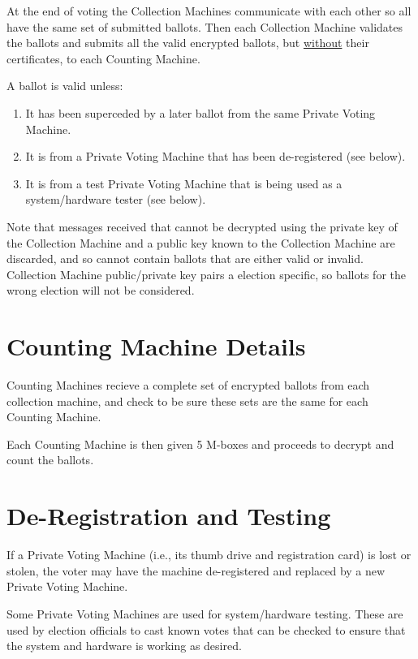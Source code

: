 \documentclass[12pt]{article}
\begin{document}
At the end of voting the Collection Machines communicate with each
other so all have the same set of submitted ballots.  Then each
Collection Machine validates the ballots and submits all the
valid encrypted ballots, but \underline{without} their certificates, to
each Counting Machine.

A ballot is valid unless:

\begin{enumerate}
\item It has been superceded by a later ballot from the same
Private Voting Machine.
\item It is from a Private Voting Machine that has been de-registered
(see below).
\item It is from a test Private Voting Machine that is
being used as a system/hardware tester (see below).
\end{enumerate}

Note that messages received that cannot be decrypted using the
private key of the Collection Machine and a public key known
to the Collection Machine are discarded, and so cannot contain
ballots that are either valid or invalid.  Collection Machine
public/private key pairs a election specific, so ballots for
the wrong election will not be considered.

\section{Counting Machine Details}

Counting Machines recieve a complete set of encrypted ballots
from each collection machine, and check to be sure these sets
are the same for each Counting Machine.

Each Counting Machine is then given 5 M-boxes and proceeds to
decrypt and count the ballots.

\section{De-Registration and Testing}

If a Private Voting Machine (i.e., its thumb drive and registration
card) is lost or stolen, the voter may have the machine de-registered
and replaced by a new Private Voting Machine.

Some Private Voting Machines are used for system/hardware testing.
These are used by election officials to cast known votes that can
be checked to ensure that the system and hardware is working as
desired.
\end{document}
